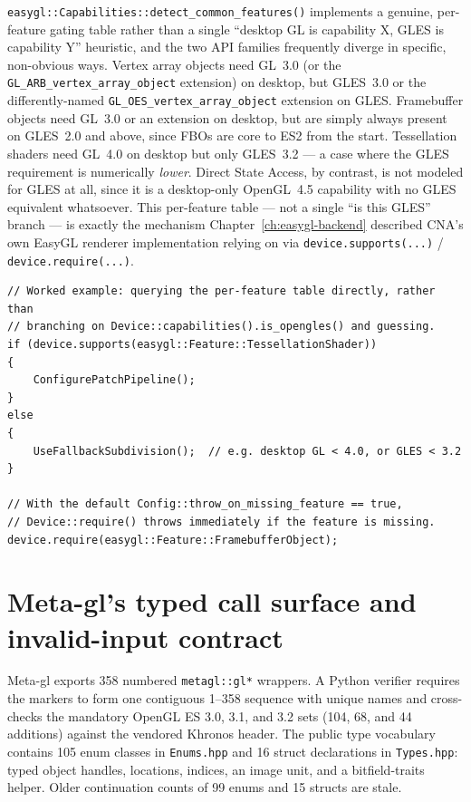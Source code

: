 \texttt{easygl::Capabilities::detect\_common\_features()}%
implements a genuine,
per-feature gating table rather than a single ``desktop GL is capability X, GLES is capability
Y'' heuristic, and the two API families frequently diverge in specific, non-obvious ways.
Vertex array objects need GL~3.0 (or the \texttt{GL\_ARB\_vertex\_array\_object} extension) on
desktop, but GLES~3.0 or the differently-named \texttt{GL\_OES\_vertex\_array\_object}
extension on GLES. Framebuffer objects need GL~3.0 or an extension on desktop, but are simply
always present on GLES~2.0 and above, since FBOs are core to ES2 from the start. Tessellation
shaders need GL~4.0 on desktop but only GLES~3.2 --- a case where the GLES requirement is
numerically \emph{lower}. Direct State Access, by contrast, is not modeled for GLES at all,
since it is a desktop-only OpenGL~4.5 capability with no GLES equivalent whatsoever. This
per-feature table --- not a single ``is this GLES'' branch --- is exactly the mechanism
Chapter~\ref{ch:easygl-backend} described CNA's own EasyGL renderer implementation
relying on via \texttt{device.supports(...)} / \texttt{device.require(...)}.

\begin{lstlisting}
// Worked example: querying the per-feature table directly, rather than
// branching on Device::capabilities().is_opengles() and guessing.
if (device.supports(easygl::Feature::TessellationShader))
{
    ConfigurePatchPipeline();
}
else
{
    UseFallbackSubdivision();  // e.g. desktop GL < 4.0, or GLES < 3.2
}

// With the default Config::throw_on_missing_feature == true,
// Device::require() throws immediately if the feature is missing.
device.require(easygl::Feature::FramebufferObject);
\end{lstlisting}

\section{Meta-gl's typed call surface and invalid-input contract}

Meta-gl exports 358 numbered \texttt{metagl::gl*} wrappers. A Python verifier requires the
markers to form one contiguous 1--358 sequence with unique names and cross-checks the mandatory
OpenGL ES 3.0, 3.1, and 3.2 sets (104, 68, and 44 additions) against the vendored Khronos
header. The public type vocabulary contains 105 enum classes in \texttt{Enums.hpp} and 16
struct declarations in \texttt{Types.hpp}: typed object handles, locations, indices, an image
unit, and a bitfield-traits helper. Older continuation counts of 99 enums and 15 structs are
stale.

